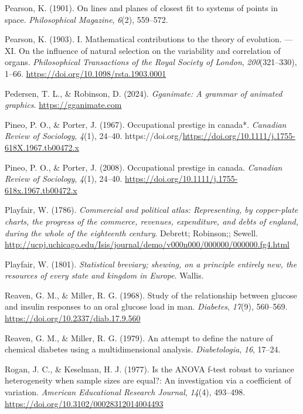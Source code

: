 \documentclass[
  letterpaper,
  10pt,
  krantz2]{krantz}
\newlength{\cslhangindent}
\newenvironment{CSLReferences}[2] %
 {\begin{list}{}{%
  \setlength{\itemindent}{0pt}
  \setlength{\leftmargin}{0pt}
  \setlength{\parsep}{0pt}
  \ifodd #1
   \setlength{\leftmargin}{\cslhangindent}
   \setlength{\itemindent}{-1\cslhangindent}
  \fi
  \setlength{\itemsep}{#2\baselineskip}}}
 {\end{list}}
\begin{document}
{\begin{CSLReferences}{1}{0}
Pearson, K. (1901). On lines and planes of closest fit to systems of
points in space. \emph{Philosophical Magazine}, \emph{6}(2), 559--572.

Pearson, K. (1903). I. Mathematical contributions to the theory of
evolution. ---XI. On the influence of natural selection on the
variability and correlation of organs. \emph{Philosophical Transactions
of the Royal Society of London}, \emph{200}(321--330), 1--66.
\url{https://doi.org/10.1098/rsta.1903.0001}

Pedersen, T. L., \& Robinson, D. (2024). \emph{Gganimate: A grammar of
animated graphics}. \url{https://gganimate.com}

Pineo, P. O., \& Porter, J. (1967). Occupational prestige in canada*.
\emph{Canadian Review of Sociology}, \emph{4}(1), 24--40.
https://doi.org/\url{https://doi.org/10.1111/j.1755-618X.1967.tb00472.x}

Pineo, P. O., \& Porter, J. (2008). Occupational prestige in canada.
\emph{Canadian Review of Sociology}, \emph{4}(1), 24--40.
\url{https://doi.org/10.1111/j.1755-618x.1967.tb00472.x}

Playfair, W. (1786). \emph{Commercial and political atlas: Representing,
by copper-plate charts, the progress of the commerce, revenues,
expenditure, and debts of england, during the whole of the eighteenth
century}. Debrett; Robinson;; Sewell.
\url{http://ucpj.uchicago.edu/Isis/journal/demo/v000n000/000000/000000.fg4.html}

Playfair, W. (1801). \emph{Statistical breviary; shewing, on a principle
entirely new, the resources of every state and kingdom in {Europe}}.
Wallis.

Reaven, G. M., \& Miller, R. G. (1968). Study of the relationship
between glucose and insulin responses to an oral glucose load in man.
\emph{Diabetes}, \emph{17}(9), 560--569.
\url{https://doi.org/10.2337/diab.17.9.560}

Reaven, G. M., \& Miller, R. G. (1979). An attempt to define the nature
of chemical diabetes using a multidimensional analysis.
\emph{Diabetologia}, \emph{16}, 17--24.

Rogan, J. C., \& Keselman, H. J. (1977). Is the {ANOVA} f-test robust to
variance heterogeneity when sample sizes are equal?: An investigation
via a coefficient of variation. \emph{American Educational Research
Journal}, \emph{14}(4), 493--498.
\url{https://doi.org/10.3102/00028312014004493}


\end{CSLReferences}}
\end{document}
